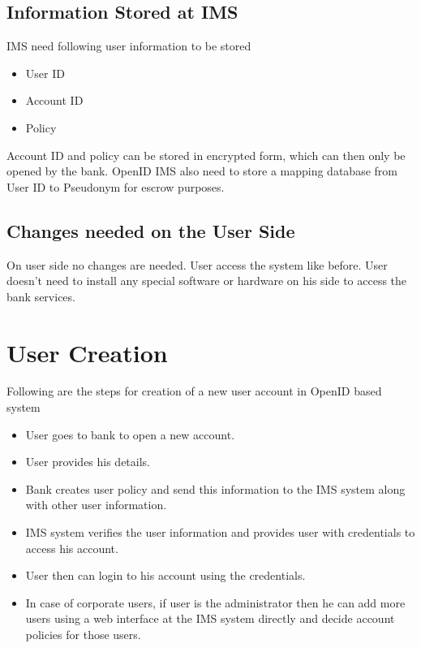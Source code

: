 \subsection{Information Stored at IMS}
IMS need following user information to be stored
\begin{itemize}
	\item User ID
	\item Account ID
	\item Policy
\end{itemize}
Account ID and policy can be stored in encrypted form, which can then only be opened by the bank. OpenID IMS also need to store a mapping database from User ID to Pseudonym for escrow purposes.
\subsection{Changes needed on the User Side}
On user side no changes are needed. User access the system like before. User doesn't need to install any special software or hardware on his side to access the bank services. 
\section{User Creation}
Following are the steps for creation of a new user account in OpenID based system
\begin{itemize}
	\item User goes to bank to open a new account.
	\item User provides his details.
	\item Bank creates user policy and send this information to the IMS system along with other user information.
	\item IMS system verifies the user information and provides user with credentials to access his account.
	\item User then can login to his account using the credentials.
	\item In case of corporate users, if user is the administrator then he can add more users using a web interface at the IMS system directly and decide account policies for those users.
\end{itemize}
